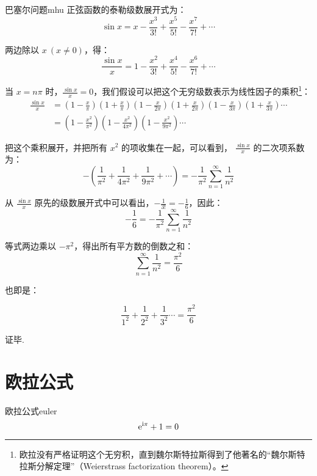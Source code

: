 \documentclass[12pt, cn]{elegantart}
\begin{document}
\begin{definition}{巴塞尔问题}{mhu}
	正弦函数的泰勒级数展开式为：
	$$
\sin x=x-\frac{x^{3}}{3 !}+\frac{x^{5}}{5 !}-\frac{x^{7}}{7 !}+\cdots
$$

两边除以 $x\ (x\neq 0)$，得：
$$
\frac{\sin x}{x}=1-\frac{x^{2}}{3 !}+\frac{x^{4}}{5 !}-\frac{x^{6}}{7 !}+\cdots
$$

当 $x=n\pi$ 时，$\frac{\sin x}{x}=0$，我们假设可以把这个无穷级数表示为线性因子的乘积\footnote{欧拉没有严格证明这个无穷积，直到魏尔斯特拉斯得到了他著名的“魏尔斯特拉斯分解定理”（Weierstrass factorization theorem）。}：
\begin{align*} \frac{\sin x}{x} &=\left(1-\frac{x}{\pi}\right)\left(1+\frac{x}{\pi}\right)\left(1-\frac{x}{2 \pi}\right)\left(1+\frac{x}{2 \pi}\right)\left(1-\frac{x}{3 \pi}\right)\left(1+\frac{x}{3 \pi}\right) \cdots \\ &=\left(1-\frac{x^{2}}{\pi^{2}}\right)\left(1-\frac{x^{2}}{4 \pi^{2}}\right)\left(1-\frac{x^{2}}{9 \pi^{2}}\right) \cdots 
\end{align*}

把这个乘积展开，并把所有 $x^2$ 的项收集在一起，可以看到， $ \frac{\sin x}{x}$ 的二次项系数为：
$$
-\left(\frac{1}{\pi^{2}}+\frac{1}{4 \pi^{2}}+\frac{1}{9 \pi^{2}}+\cdots\right)=-\frac{1}{\pi^{2}} \sum_{n=1}^{\infty} \frac{1}{n^{2}}
$$

从 $ \frac{\sin x}{x}$ 原先的级数展开式中可以看出，$ -\frac{1}{3 !}=-\frac{1}{6}$，因此：
$$
-\frac{1}{6}=-\frac{1}{\pi^{2}} \sum_{n=1}^{\infty} \frac{1}{n^{2}}
$$

等式两边乘以 $-\pi^2$，得出所有平方数的倒数之和：
$$
\sum_{n=1}^{\infty} \frac{1}{n^{2}}=\frac{\pi^{2}}{6}
$$

也即是：

$$ \frac{1}{1^{2}}+\frac{1}{2^{2}}+\frac{1}{3^{2}} \cdots=\frac{\pi^2}{6}
$$

证毕.
\end{definition}
\vspace{10pt}

\section{欧拉公式}

\begin{theorem}{欧拉公式}{euler}
	\begin{equation}
		\mathrm{e}^{\mathrm{i} \pi}+1=0
	\end{equation}
   \vspace{-15pt}
\end{theorem}
\clearpage
\end{document}
